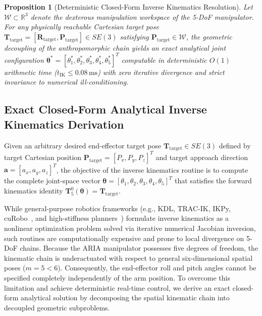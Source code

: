\documentclass[journal]{IEEEtran}
\newtheorem{proposition}{Proposition}
\begin{document}
\begin{proposition}[Deterministic Closed-Form Inverse Kinematics Resolution]
\label{prop_ik}
Let $\mathcal{W} \subset \mathbb{R}^3$ denote the dexterous manipulation workspace of the 5-DoF manipulator. For any physically reachable Cartesian target pose $\mathbf{T}_{\text{target}} = [\mathbf{R}_{\text{target}}, \mathbf{P}_{\text{target}}] \in SE(3)$ satisfying $\mathbf{P}_{\text{target}} \in \mathcal{W}$, the geometric decoupling of the anthropomorphic chain yields an exact analytical joint configuration $\boldsymbol{\theta}^* = [\theta_1^*, \theta_2^*, \theta_3^*, \theta_4^*, \theta_5^*]^T$ computable in deterministic $O(1)$ arithmetic time ($t_{\text{IK}} \le 0.08\,\text{ms}$) with zero iterative divergence and strict invariance to numerical ill-conditioning.
\end{proposition}

\subsection{Exact Closed-Form Analytical Inverse Kinematics Derivation}
Given an arbitrary desired end-effector target pose $\mathbf{T}_{\text{target}} \in SE(3)$ defined by target Cartesian position $\mathbf{P}_{\text{target}} = [P_x, P_y, P_z]^T$ and target approach direction $\mathbf{a} = [a_x, a_y, a_z]^T$, the objective of the inverse kinematics routine is to compute the complete joint-space vector $\boldsymbol{\theta} = [\theta_1, \theta_2, \theta_3, \theta_4, \theta_5]^T$ that satisfies the forward kinematics identity $\mathbf{T}_5^0(\boldsymbol{\theta}) = \mathbf{T}_{\text{target}}$.

While general-purpose robotics frameworks (e.g., KDL, TRAC-IK, IKPy, cuRobo~\cite{aria_050_sundaralingam_2024_curobo}, and high-stiffness planners~\cite{aria_044_pang_2025_highstiffness}) formulate inverse kinematics as a nonlinear optimization problem solved via iterative numerical Jacobian inversion, such routines are computationally expensive and prone to local divergence on 5-DoF chains. Because the ARIA manipulator possesses five degrees of freedom, the kinematic chain is underactuated with respect to general six-dimensional spatial poses ($m=5 < 6$). Consequently, the end-effector roll and pitch angles cannot be specified completely independently of the arm position. To overcome this limitation and achieve deterministic real-time control, we derive an exact closed-form analytical solution by decomposing the spatial kinematic chain into decoupled geometric subproblems.
\end{document}
